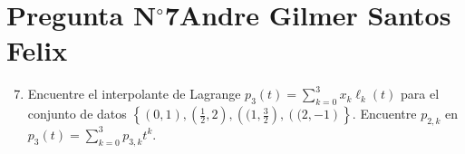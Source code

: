 \section{Pregunta N$^{\circ}$7\qquad Andre Gilmer Santos Felix}

\begin{frame}
	\begin{enumerate}\setcounter{enumi}{6}
		\item

		      Encuentre el interpolante de Lagrange
		      \begin{math}
			      p_{3}\left(t\right)=
			      \sum\limits_{k=0}^{3}
			      x_{k}
			      \ell_{k}\left(t\right)
		      \end{math}
		      para el conjunto de datos
		      \begin{math}
			      \left\{
			      \left(0,1\right),
			      \left(\frac{1}{2},2\right),
			      \left((1,\frac{3}{2}\right),
			      \left((2,-1\right)
			      \right\}
		      \end{math}.
		      Encuentre $p_{2,k}$ en
		      \begin{math}
			      p_{3}\left(t\right)=
			      \sum\limits_{k=0}^{3}
			      p_{3,k}t^{k}
		      \end{math}.
	\end{enumerate}


\end{frame}

